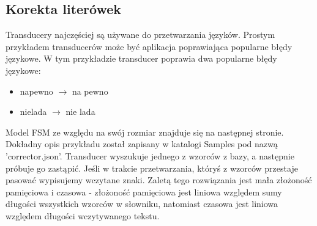 \documentclass[declaration,shortabstract]{iithesis}
\theoremstyle{definition}
\theoremstyle{plain}
\begin{document}
\subsection{Korekta literówek}
Transducery najczęściej są używane do przetwarzania języków. Prostym przykładem transducerów może być aplikacja poprawiająca popularne błędy językowe. W tym przykładzie transducer poprawia dwa popularne błędy językowe:
\begin{itemize}
\item napewno \(\rightarrow\) na pewno
\item nielada \(\rightarrow\) nie lada
\end{itemize}
Model FSM ze względu na swój rozmiar znajduje się na następnej stronie. Dokładny opis przykładu został zapisany w katalogi Samples pod nazwą 'corrector.json'. Transducer wyszukuje jednego z wzorców z bazy, a następnie próbuje go zastąpić. Jeśli w trakcie przetwarzania, któryś z wzorców przestaje pasować wypisujemy wczytane znaki. Zaletą tego rozwiązania jest mała złożoność pamięciowa i czasowa - złożoność pamięciowa jest liniowa względem sumy długości wszystkich wzorców w słowniku, natomiast czasowa jest liniowa względem długości wczytywanego tekstu.
\end{document}
